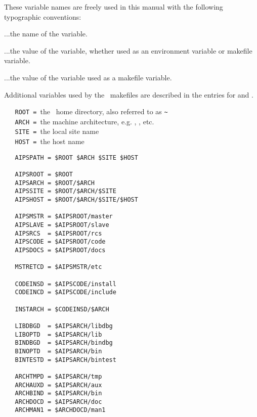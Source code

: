These variable names are freely used in this manual with the following
typographic conventions:

\begin{description}
   \item{}       ...the name of the variable.
   \item{}     ...the value of the  variable,
      whether used as an environment variable or makefile variable.
   \item{}   ...the value of the  variable
      used as a makefile variable.
\end{description}
 
Additional variables used by the \aipspp\ makefiles are described in the
entries for  and .
 
\noindent
\verb+   ROOT = +the \aipspp\ home directory, also referred to as
                 \verb+~+\\
\verb+   ARCH = +the machine architecture, e.g. , ,
                 etc.\\
\verb+   SITE = +the local site name\\
\verb+   HOST = +the host name
 
\begin{verbatim}
   AIPSPATH = $ROOT $ARCH $SITE $HOST
 
   AIPSROOT = $ROOT
   AIPSARCH = $ROOT/$ARCH
   AIPSSITE = $ROOT/$ARCH/$SITE
   AIPSHOST = $ROOT/$ARCH/$SITE/$HOST
 
   AIPSMSTR = $AIPSROOT/master
   AIPSLAVE = $AIPSROOT/slave
   AIPSRCS  = $AIPSROOT/rcs
   AIPSCODE = $AIPSROOT/code
   AIPSDOCS = $AIPSROOT/docs
 
   MSTRETCD = $AIPSMSTR/etc
 
   CODEINSD = $AIPSCODE/install
   CODEINCD = $AIPSCODE/include

   INSTARCH = $CODEINSD/$ARCH
 
   LIBDBGD  = $AIPSARCH/libdbg
   LIBOPTD  = $AIPSARCH/lib
   BINDBGD  = $AIPSARCH/bindbg
   BINOPTD  = $AIPSARCH/bin
   BINTESTD = $AIPSARCH/bintest
 
   ARCHTMPD = $AIPSARCH/tmp
   ARCHAUXD = $AIPSARCH/aux
   ARCHBIND = $AIPSARCH/bin
   ARCHDOCD = $AIPSARCH/doc
   ARCHMAN1 = $ARCHDOCD/man1
\end{verbatim}


